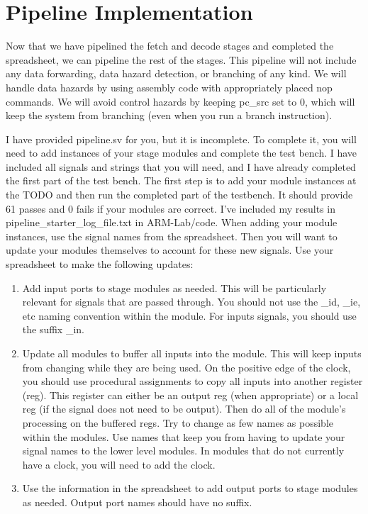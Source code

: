 \section{Pipeline Implementation}
Now that we have pipelined the fetch and decode stages and completed the spreadsheet, we can pipeline the rest of the stages.  This pipeline will not include any data forwarding, data hazard detection, or branching of any kind.  We will handle data hazards by using assembly code with appropriately placed nop commands.  We will avoid control hazards by keeping pc\_src set to 0, which will keep the system from branching (even when you run a branch instruction).  

I have provided pipeline.sv for you, but it is incomplete.  To complete it, you will need to add instances of your stage modules and complete the test bench.  I have included all signals and strings that you will need, and I have already completed the first part of the test bench.  The first step is to add your module instances at the TODO and then run the completed part of the testbench.  It should provide 61 passes and 0 fails if your modules are correct.  I've included my results in pipeline\_starter\_log\_file.txt in ARM-Lab/code.  When adding your module instances, use the signal names from the spreadsheet.  Then you will want to update your modules themselves to account for these new signals.  Use your spreadsheet to make the following updates:
\begin{enumerate}
	\item Add input ports to stage modules as needed.  This will be particularly relevant for signals that are passed through.  You should not use the \_id, \_ie, etc naming convention within the module.  For inputs signals, you should use the suffix \_in.
	\item Update all modules to buffer all inputs into the module.  This will keep inputs from changing while they are being used.  On the positive edge of the clock, you should use procedural assignments to copy all inputs into another register (reg).  This register can either be an output reg (when appropriate) or a local reg (if the signal does not need to be output).  Then do all of the module's processing on the buffered regs.  Try to change as few names as possible within the modules.  Use names that keep you from having to update your signal names to the lower level modules.  In modules that do not currently have a clock, you will need to add the clock.
	\item Use the information in the spreadsheet to add output ports to stage modules as needed. Output port names should have no suffix.
\end{enumerate}


